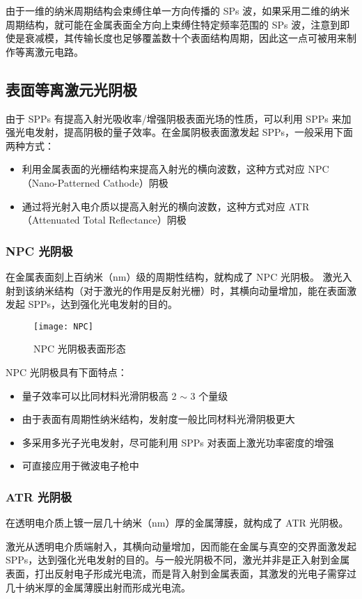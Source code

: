 由于一维的纳米周期结构会束缚住单一方向传播的 SPs 波，如果采用二维的纳米周期结构，就可能在金属表面全方向上束缚住特定频率范围的 SPs 波，注意到即使是衰减模，其传输长度也足够覆盖数十个表面结构周期，因此这一点可被用来制作等离激元电路。

\subsection{表面等离激元光阴极}
由于 SPPs 有提高入射光吸收率/增强阴极表面光场的性质，可以利用 SPPs 来加强光电发射，提高阴极的量子效率。在金属阴极表面激发起 SPPs，一般采用下面两种方式：
\begin{itemize}
	\item 利用金属表面的光栅结构来提高入射光的横向波数，这种方式对应 NPC（Nano-Patterned Cathode）阴极
	\item 通过将光射入电介质以提高入射光的横向波数，这种方式对应 ATR（Attenuated Total Reflectance）阴极
\end{itemize}

\subsubsection{NPC 光阴极}
在金属表面刻上百纳米（nm）级的周期性结构，就构成了 NPC 光阴极。
激光入射到该纳米结构（对于激光的作用是反射光栅）时，其横向动量增加，能在表面激发起 SPPs，达到强化光电发射的目的。

\begin{figure}[htbp]
\centering
\texttt{[image: NPC]}
\caption{\label{fig:NPC} NPC 光阴极表面形态}
\end{figure}

NPC 光阴极具有下面特点：
\begin{itemize}
	\item 量子效率可以比同材料光滑阴极高 2 $\sim$ 3 个量级
	\item 由于表面有周期性纳米结构，发射度一般比同材料光滑阴极更大
	\item 多采用多光子光电发射，尽可能利用 SPPs 对表面上激光功率密度的增强
	\item 可直接应用于微波电子枪中
\end{itemize}


\subsubsection{ATR 光阴极}
在透明电介质上镀一层几十纳米（nm）厚的金属薄膜，就构成了 ATR 光阴极。

激光从透明电介质端射入，其横向动量增加，因而能在金属与真空的交界面激发起 SPPs，达到强化光电发射的目的。与一般光阴极不同，激光并非是正入射到金属表面，打出反射电子形成光电流，而是背入射到金属表面，其激发的光电子需穿过几十纳米厚的金属薄膜出射而形成光电流。

